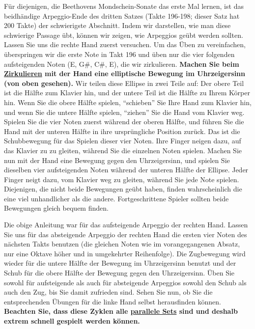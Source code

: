 Für diejenigen, die Beethovens Mondschein-Sonate das erste Mal lernen, ist das beidhändige Arpeggio-Ende des dritten Satzes (Takte 196-198; dieser Satz hat 200 Takte) der schwierigste Abschnitt.
Indem wir darstellen, wie man diese schwierige Passage übt, können wir zeigen, wie Arpeggios geübt werden sollten.
Lassen Sie uns die rechte Hand zuerst versuchen.
Um das Üben zu vereinfachen, überspringen wir die erste Note in Takt 196 und üben nur die vier folgenden aufsteigenden Noten (E, G\#, C\#, E), die wir zirkulieren.
\textbf{Machen Sie beim \hyperlink{c1iii2}{Zirkulieren} mit der Hand eine elliptische Bewegung im Uhrzeigersinn (von oben gesehen).}
Wir teilen diese Ellipse in zwei Teile auf: Der obere Teil ist die Hälfte zum Klavier hin, und der untere Teil ist die Hälfte zu Ihrem Körper hin.
Wenn Sie die obere Hälfte spielen, \enquote{schieben} Sie Ihre Hand zum Klavier hin, und wenn Sie die untere Hälfte spielen, \enquote{ziehen} Sie die Hand vom Klavier weg.
Spielen Sie die vier Noten zuerst während der oberen Hälfte, und führen Sie die Hand mit der unteren Hälfte in ihre ursprüngliche Position zurück.
Das ist die Schubbewegung für das Spielen dieser vier Noten.
Ihre Finger neigen dazu, auf das Klavier zu zu gleiten, während Sie die einzelnen Noten spielen.
Machen Sie nun mit der Hand eine Bewegung gegen den Uhrzeigersinn, und spielen Sie dieselben vier aufsteigenden Noten während der unteren Hälfte der Ellipse.
Jeder Finger neigt dazu, vom Klavier weg zu gleiten, während Sie jede Note spielen.
Diejenigen, die nicht beide Bewegungen geübt haben, finden wahrscheinlich die eine viel unhandlicher als die andere.
Fortgeschrittene Spieler sollten beide Bewegungen gleich bequem finden.

Die obige Anleitung war für das aufsteigende Arpeggio der rechten Hand.
Lassen Sie uns für das absteigende Arpeggio der rechten Hand die ersten vier Noten des nächsten Takts benutzen (die gleichen Noten wie im vorangegangenen Absatz, nur eine Oktave höher und in umgekehrter Reihenfolge).
Die Zugbewegung wird wieder für die untere Hälfte der Bewegung im Uhrzeigersinn benutzt und der Schub für die obere Hälfte der Bewegung gegen den Uhrzeigersinn.
Üben Sie sowohl für aufsteigende als auch für absteigende Arpeggios sowohl den Schub als auch den Zug, bis Sie damit zufrieden sind.
Sehen Sie nun, ob Sie die entsprechenden Übungen für die linke Hand selbst herausfinden können.
\textbf{Beachten Sie, dass diese Zyklen alle \hyperlink{c1ii11}{parallele Sets} sind und deshalb extrem schnell gespielt werden können.}

